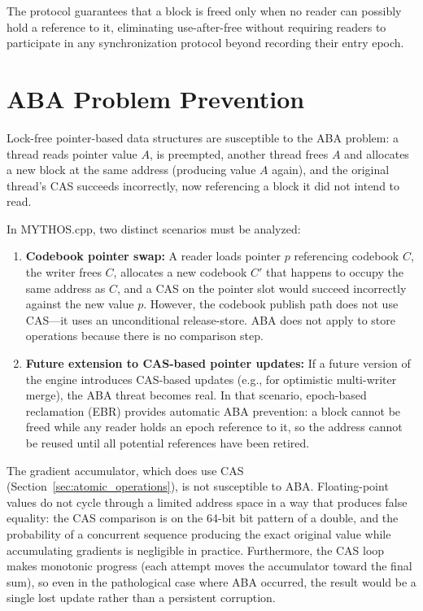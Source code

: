 The protocol guarantees that a block is freed only when no reader can possibly hold a reference to it, eliminating use-after-free without requiring readers to participate in any synchronization protocol beyond recording their entry epoch.

\section{ABA Problem Prevention}
\label{sec:aba_prevention}

Lock-free pointer-based data structures are susceptible to the ABA problem: a thread reads pointer value $A$, is preempted, another thread frees $A$ and allocates a new block at the same address (producing value $A$ again), and the original thread's CAS succeeds incorrectly, now referencing a block it did not intend to read.

In MYTHOS.cpp, two distinct scenarios must be analyzed:

\begin{enumerate}
    \item \textbf{Codebook pointer swap:} A reader loads pointer $p$ referencing codebook $C$, the writer frees $C$, allocates a new codebook $C'$ that happens to occupy the same address as $C$, and a CAS on the pointer slot would succeed incorrectly against the new value $p$. However, the codebook publish path does not use CAS---it uses an unconditional release-store. ABA does not apply to store operations because there is no comparison step.

    \item \textbf{Future extension to CAS-based pointer updates:} If a future version of the engine introduces CAS-based updates (e.g., for optimistic multi-writer merge), the ABA threat becomes real. In that scenario, epoch-based reclamation (EBR) provides automatic ABA prevention: a block cannot be freed while any reader holds an epoch reference to it, so the address cannot be reused until all potential references have been retired.
\end{enumerate}

The gradient accumulator, which does use CAS (Section~\ref{sec:atomic_operations}), is not susceptible to ABA. Floating-point values do not cycle through a limited address space in a way that produces false equality: the CAS comparison is on the 64-bit bit pattern of a double, and the probability of a concurrent sequence producing the exact original value while accumulating gradients is negligible in practice. Furthermore, the CAS loop makes monotonic progress (each attempt moves the accumulator toward the final sum), so even in the pathological case where ABA occurred, the result would be a single lost update rather than a persistent corruption.


